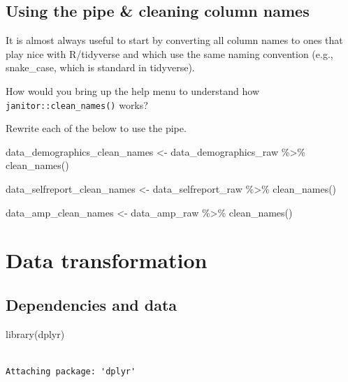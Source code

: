 \documentclass[
  letterpaper,
  DIV=11,
  numbers=noendperiod]{scrreprt}
\newenvironment{Shaded}{\begin{snugshade}}{\end{snugshade}}
\newcommand{\FunctionTok}[1]{\textcolor[rgb]{0.28,0.35,0.67}{#1}}
\newcommand{\NormalTok}[1]{\textcolor[rgb]{0.00,0.23,0.31}{#1}}
\newcommand{\OtherTok}[1]{\textcolor[rgb]{0.00,0.23,0.31}{#1}}
\newcommand{\SpecialCharTok}[1]{\textcolor[rgb]{0.37,0.37,0.37}{#1}}
\begin{document}
\section{Using the pipe \& cleaning column
names}\label{using-the-pipe-cleaning-column-names}

It is almost always useful to start by converting all column names to
ones that play nice with R/tidyverse and which use the same naming
convention (e.g., snake\_case, which is standard in tidyverse).

How would you bring up the help menu to understand how
\texttt{janitor::clean\_names()} works?

Rewrite each of the below to use the pipe.

\begin{Shaded}
\begin{Highlighting}[]
\NormalTok{data\_demographics\_clean\_names }\OtherTok{\textless{}{-}}\NormalTok{ data\_demographics\_raw }\SpecialCharTok{\%\textgreater{}\%}
  \FunctionTok{clean\_names}\NormalTok{() }

\NormalTok{data\_selfreport\_clean\_names }\OtherTok{\textless{}{-}}\NormalTok{ data\_selfreport\_raw }\SpecialCharTok{\%\textgreater{}\%}
  \FunctionTok{clean\_names}\NormalTok{() }

\NormalTok{data\_amp\_clean\_names }\OtherTok{\textless{}{-}}\NormalTok{ data\_amp\_raw }\SpecialCharTok{\%\textgreater{}\%}
  \FunctionTok{clean\_names}\NormalTok{() }
\end{Highlighting}
\end{Shaded}


\chapter{Data transformation}\label{data-transformation}

\section{Dependencies and data}\label{dependencies-and-data}

\begin{Shaded}
\begin{Highlighting}[]
\FunctionTok{library}\NormalTok{(dplyr)}
\end{Highlighting}
\end{Shaded}

\begin{verbatim}

Attaching package: 'dplyr'
\end{verbatim}
\end{document}
